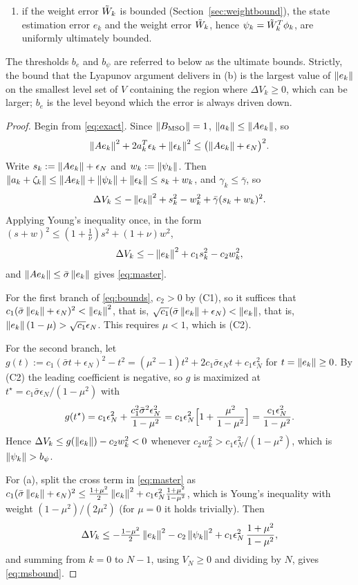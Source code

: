 \begin{theorem}
\begin{enumerate}[label=(\alph*),leftmargin=*]
\begin{equation}
\le c_1\epsilon_N^2\,\frac{1+\mu^2}{1-\mu^2};
\end{equation}
\item if the weight error $\tilde{W}_k$ is bounded (Section~\ref{sec:weightbound}),
the state estimation error $e_k$ and the weight error $\tilde{W}_k$, hence
$\psi_k=\tilde{W}_k^T\phi_k$, are uniformly ultimately bounded.
\end{enumerate}
The thresholds $b_e$ and $b_\psi$ are referred to below as the ultimate bounds.
Strictly, the bound that the Lyapunov argument delivers in (b) is the largest
value of $\left\lVert e_k \right\rVert$ on the smallest level set of $V$ containing the region
where $\Delta V_k\ge0$, which can be larger; $b_e$ is the level beyond which the
error is always driven down.
\end{theorem}

\begin{proof}
Begin from \eqref{eq:exact}. Since $\left\lVert B_{\mathrm{MSO}} \right\rVert=1$, $\left\lVert a_k \right\rVert\le\left\lVert Ae_k \right\rVert$, so
\[
\left\lVert Ae_k \right\rVert^2+2a_k^T\epsilon_k+\left\lVert \epsilon_k \right\rVert^2
\le\bigl(\left\lVert Ae_k \right\rVert+\epsilon_N\bigr)^2 .
\]
Write $s_k:=\left\lVert Ae_k \right\rVert+\epsilon_N$ and $w_k:=\left\lVert \psi_k \right\rVert$. Then
$\left\lVert a_k+\zeta_k \right\rVert\le\left\lVert Ae_k \right\rVert+\left\lVert \psi_k \right\rVert+\left\lVert \epsilon_k \right\rVert\le s_k+w_k$,
and $\gamma_k\le\bar\gamma$, so
\[
\Delta V_k\le-\left\lVert e_k \right\rVert^2+s_k^2-w_k^2+\bar\gamma(s_k+w_k)^2 .
\]
Applying Young's inequality \cite{young1912classes} once, in the form
$(s+w)^2\le(1+\tfrac{1}{\nu})s^2+(1+\nu)w^2$,
\[
\Delta V_k\le-\left\lVert e_k \right\rVert^2+c_1s_k^2-c_2w_k^2 ,
\]
and $\left\lVert Ae_k \right\rVert\le\bar\sigma\left\lVert e_k \right\rVert$ gives \eqref{eq:master}.

For the first branch of \eqref{eq:bounds}, $c_2>0$ by (C1), so it suffices that
$c_1(\bar\sigma\left\lVert e_k \right\rVert+\epsilon_N)^2<\left\lVert e_k \right\rVert^2$, that is,
$\sqrt{c_1}(\bar\sigma\left\lVert e_k \right\rVert+\epsilon_N)<\left\lVert e_k \right\rVert$, that is,
$\left\lVert e_k \right\rVert(1-\mu)>\sqrt{c_1}\epsilon_N$. This requires $\mu<1$, which is (C2).

For the second branch, let
$g(t):=c_1(\bar\sigma t+\epsilon_N)^2-t^2
=(\mu^2-1)t^2+2c_1\bar\sigma\epsilon_N t+c_1\epsilon_N^2$
for $t=\left\lVert e_k \right\rVert\ge0$. By (C2) the leading coefficient is negative, so $g$ is
maximized at $t^\star=c_1\bar\sigma\epsilon_N/(1-\mu^2)$ with
\[
g(t^\star)=c_1\epsilon_N^2+\frac{c_1^2\bar\sigma^2\epsilon_N^2}{1-\mu^2}
=c_1\epsilon_N^2\Bigl[1+\frac{\mu^2}{1-\mu^2}\Bigr]
=\frac{c_1\epsilon_N^2}{1-\mu^2}.
\]
Hence $\Delta V_k\le g(\left\lVert e_k \right\rVert)-c_2w_k^2<0$ whenever
$c_2w_k^2>c_1\epsilon_N^2/(1-\mu^2)$, which is $\left\lVert \psi_k \right\rVert>b_\psi$.

For (a), split the cross term in \eqref{eq:master} as
$c_1(\bar\sigma\left\lVert e_k \right\rVert+\epsilon_N)^2\le\tfrac{1+\mu^2}{2}\left\lVert e_k \right\rVert^2
+c_1\epsilon_N^2\tfrac{1+\mu^2}{1-\mu^2}$, which is Young's inequality with
weight $(1-\mu^2)/(2\mu^2)$ (for $\mu=0$ it holds trivially). Then
\[
\Delta V_k\le-\tfrac{1-\mu^2}{2}\left\lVert e_k \right\rVert^2-c_2\left\lVert \psi_k \right\rVert^2
+c_1\epsilon_N^2\,\frac{1+\mu^2}{1-\mu^2},
\]
and summing from $k=0$ to $N-1$, using $V_N\ge0$ and dividing by $N$, gives
\eqref{eq:msbound}.


\end{proof}
